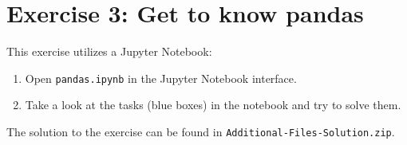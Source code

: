 \documentclass[
english,
smallborders
]{i6prcsht}
\begin{document}
\section*{Exercise 3: Get to know pandas}

This exercise utilizes a Jupyter Notebook:

\begin{enumerate}
	\item Open \texttt{pandas.ipynb} in the Jupyter Notebook interface.
	\item Take a look at the tasks (blue boxes) in the notebook and try to solve them.
\end{enumerate}

\begin{solution}
	The solution to the exercise can be found in \texttt{Additional-Files-Solution.zip}.
\end{solution}
\end{document}

